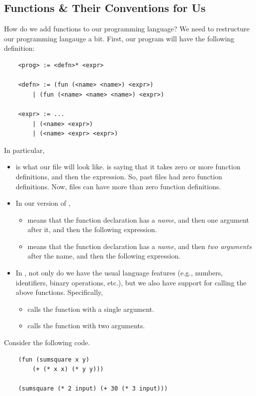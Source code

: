 \documentclass[letterpaper]{article}
\begin{document}
\subsection{Functions \& Their Conventions for Us}
How do we add functions to our programming language? We need to restructure our programming langauge a bit. First, our program will have the following definition: 
\begin{verbatim}
    <prog> := <defn>* <expr>

    <defn> := (fun (<name> <name>) <expr>)
        | (fun (<name> <name> <name>) <expr>)

    <expr> := ... 
        | (<name> <expr>) 
        | (<name> <expr> <expr>)\end{verbatim}
In particular, 
\begin{itemize}
    \item {} is what our  file will look like.  is saying that it takes zero or more function definitions, and then the expression. So, past  files had zero function definitions. Now,  files can have more than zero function definitions.
    \item In our version of , 
    \begin{itemize}
        \item {} means that the function declaration has a \emph{name}, and then one argument after it, and then the following expression. 
        \item {} means that the function declaration has a \emph{name}, and then \emph{two arguments} after the name, and then the following expression.
    \end{itemize}
    \item In , not only do we have the usual language features (e.g., numbers, identifiers, binary operations, etc.), but we also have support for calling the above functions. Specifically,
    \begin{itemize}
        \item {} calls the function  with a single argument.
        \item {} calls the function  with two arguments.
    \end{itemize}
\end{itemize}
Consider the following code. 
    \begin{verbatim}
    (fun (sumsquare x y)
        (+ (* x x) (* y y)))

    (sumsquare (* 2 input) (+ 30 (* 3 input)))\end{verbatim}
\end{document}
